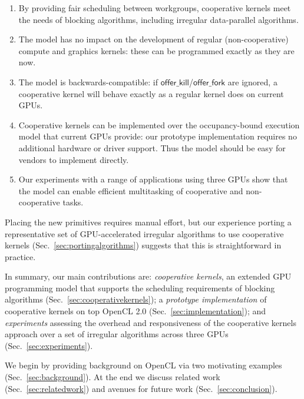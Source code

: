 \documentclass[numbers,nocopyrightspace,10pt]{sigplanconf}
\newcommand{\mysec}{Sec.~}
\newcommand{\offerfork}{\mathsf{offer\_fork}}
\newcommand{\offerkill}{\mathsf{offer\_kill}}
\begin{document}
\vspace{-1mm}
\begin{enumerate}

\item By providing fair scheduling between workgroups, cooperative
  kernels meet the needs of blocking algorithms, including irregular
  data-parallel algorithms.

\item The model has no impact on the development of regular
  (non-cooperative) compute and graphics kernels: these can be programmed exactly as they
  are now.

\item The model is backwards-compatible: if $\offerkill$/$\offerfork$ are ignored, a cooperative kernel will behave
  exactly as a regular kernel does on current GPUs.

\item Cooperative kernels can be implemented over the occupancy-bound
  execution model that current GPUs provide: our prototype implementation requires
  no additional hardware or driver support.  Thus the model should be easy for vendors to implement directly.

\item Our experiments with a range of applications using three GPUs show that the model can enable efficient multitasking of cooperative and non-cooperative
  tasks.

\end{enumerate}
\vspace{-1mm}

Placing the new primitives requires manual effort, but our experience porting a representative set of
GPU-accelerated irregular algorithms to use cooperative kernels
(\mysec\ref{sec:portingalgorithms}) suggests that this is straightforward in practice.

In summary, our main contributions are:
\emph{cooperative kernels}, an extended GPU programming model that supports the scheduling requirements of blocking algorithms (\mysec\ref{sec:cooperativekernels}); a \emph{prototype implementation} of cooperative
  kernels on top OpenCL 2.0
  (\mysec\ref{sec:implementation}); and \emph{experiments} assessing the overhead and responsiveness of the cooperative kernels approach over a set of irregular algorithms across three GPUs (\mysec\ref{sec:experiments}).

We begin by providing background on OpenCL via two motivating examples (\mysec\ref{sec:background}).  At the end we discuss related work (\mysec\ref{sec:relatedwork}) and avenues for future work (\mysec\ref{sec:conclusion}).
\end{document}
